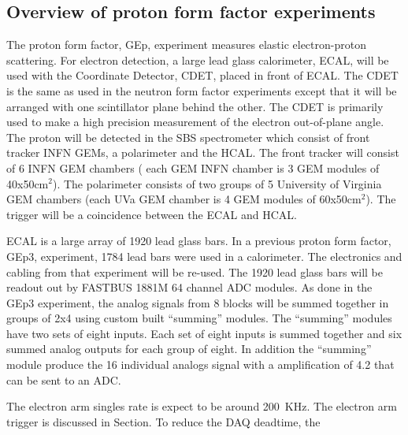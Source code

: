\documentclass{article}
\begin{document}
\subsection{Overview of proton form factor experiments}
The proton form factor, GEp, experiment measures elastic electron-proton scattering. For electron
detection, a large lead glass calorimeter, ECAL,  will be used with the Coordinate Detector, CDET, placed in front
of ECAL. The CDET is the same as used in the neutron form factor experiments except
that it will be arranged with one scintillator plane behind the other. The CDET is primarily used
to make a high precision measurement of the electron out-of-plane angle. The proton will be
detected in the SBS spectrometer which consist of front tracker INFN GEMs, a polarimeter and the HCAL.
The front tracker will consist of 6 INFN GEM chambers ( each GEM INFN chamber is 3 GEM modules of 40x50cm$^2$).
The polarimeter consists of two groups of 5 University of Virginia GEM chambers (each UVa GEM chamber
is 4 GEM modules of 60x50cm$^2$). The trigger will be a coincidence between the ECAL and HCAL.

ECAL is a large array of 1920 lead glass bars. In a previous proton form factor, GEp3,  experiment, 1784 lead bars
were used in a calorimeter. The electronics and cabling from that experiment will be re-used. The 1920
lead glass bars will be readout out by  FASTBUS 1881M 64 channel ADC modules. As done in the GEp3 experiment,
the analog signals from 8 blocks will be summed together in groups of 2x4 using custom built ``summing'' modules.
The ``summing'' modules have two sets of eight inputs. Each set of eight inputs is summed together
and six summed analog outputs for each group of eight. In addition the ``summing'' module produce the 16 individual
analogs signal with a amplification of 4.2 that can be sent to an ADC.

 
The electron arm
singles rate is expect to be around 200~KHz. The electron arm trigger is discussed in Section. To reduce
the DAQ deadtime, the 
\end{document}
